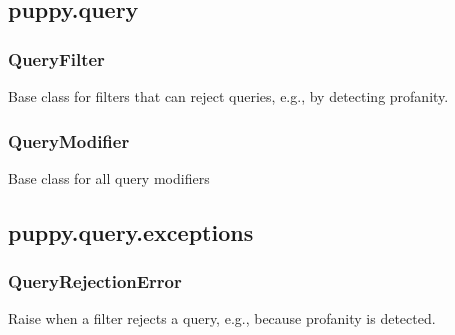 \documentclass[letterpaper,10pt,english]{sphinxmanual}
\begin{document}
\subsection{puppy.query}
\label{api2.0:module-puppy.query}\label{api2.0:id1}

\subsubsection{QueryFilter}
\label{api2.0:queryfilter}

\begin{fulllineitems}
\label{api2.0:puppy.query.QueryFilter}
Base class for filters that can reject queries, e.g., by detecting
profanity.

\end{fulllineitems}



\subsubsection{QueryModifier}
\label{api2.0:querymodifier}

\begin{fulllineitems}
\label{api2.0:puppy.query.QueryModifier}
Base class for all query modifiers

\end{fulllineitems}



\subsection{puppy.query.exceptions}
\label{api2.0:module-puppy.query.exceptions}\label{api2.0:puppy-query-exceptions}

\subsubsection{QueryRejectionError}
\label{api2.0:queryrejectionerror}

\begin{fulllineitems}
\label{api2.0:puppy.query.exceptions.QueryRejectionError}
Raise when a filter rejects a query, e.g., because profanity is
detected.

\end{fulllineitems}
\end{document}
